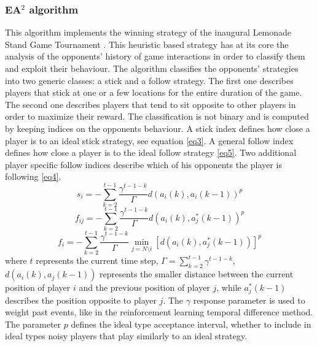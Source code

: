 \documentclass[runningheads]{llncs}
\begin{document}
\subsubsection{EA$^2$ algorithm}
This algorithm implements the winning strategy of the inaugural
Lemonade Stand Game Tournament \cite{ea2}. This heuristic based
strategy has at its core the analysis of the opponents' history of
game interactions in order to classify them and exploit their
behaviour. The algorithm classifies the opponents' strategies into two
generic classes: a stick and a follow strategy. The first one
describes players that stick at one or a few locations for the entire
duration of the game. The second one describes players that tend to
sit opposite to other players in order to maximize their reward. The
classification is not binary and is computed by keeping indices on the
opponents behaviour. A stick index defines how close a player is to an
ideal stick strategy, see equation \ref{eq3}. A general follow index
defines how close a player is to the ideal follow strategy \ref{eq5}. Two
additional player specific follow indices describe which of his
opponents the player is following \ref{eq4}.
\begin{equation}\label{eq3}
  s_i = - \sum_{k = 2}^{t-1}\frac{\gamma^{t-1-k}}{\Gamma}d(a_i(k), a_i(k-1))^p
\end{equation}
\begin{equation}\label{eq4}
f_{ij} = - \sum_{k = 2}^{t-1}\frac{\gamma^{t-1-k}}{\Gamma}d(a_i(k), a_j^*(k-1))^p
\end{equation}
\begin{equation}\label{eq5}
f_{i} = - \sum_{k = 2}^{t-1}\frac{\gamma^{t-1-k}}{\Gamma}\min_{j = N \setminus i}[d(a_i(k), a_j^*(k-1))]^p
\end{equation}
where $t$ represents the current time step, $\Gamma = \sum_{k =
  2}^{t-1}\gamma^{t-1-k}$, $d(a_i(k), a_j(k-1))$ represents the
smaller distance between the current position of player $i$ and
the previous position of player $j$, while $a_j^*(k-1)$ describes the
position opposite to player $j$. The $\gamma$ response parameter is
used to weight past events, like in the reinforcement learning
temporal difference method. The parameter $p$ defines the ideal type
acceptance interval, whether to include in ideal types noisy players
that play similarly to an ideal strategy.
\end{document}
